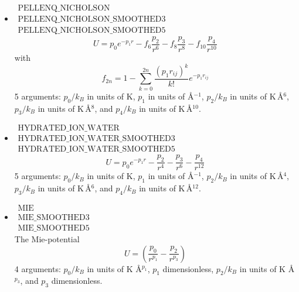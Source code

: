 \begin{itemize}
\item{$\begin{array}{l}\text{PELLENQ\_NICHOLSON}\\
      \text{PELLENQ\_NICHOLSON\_SMOOTHED3}\\
      \text{PELLENQ\_NICHOLSON\_SMOOTHED5}\end{array}$}\\
  \begin{equation}
    U= p_0 e^{-p_1 r}-f_6 \frac{p_2}{r^6}-f_8\frac{p_3}{r^8}-f_{10}\frac{p_4}{r^{10}}
  \end{equation}
  with
  \begin{equation}
   f_{2n}=1-\sum_{k=0}^{2n}\frac{\left(p_1 r_{ij}\right)^k}{k!} e^{-p_1 r_{ij}}
  \end{equation}
  5 arguments: $p_0/k_B$ in units of K, $p_1$ in units of \AA$^{-1}$, $p_2/k_B$ in units of K\,\AA$^{6}$,
  $p_3/k_B$ in units of K\,\AA$^{8}$, and $p_4/k_B$ in units of K\,\AA$^{10}$.

\item{$\begin{array}{l}\text{HYDRATED\_ION\_WATER}\\
      \text{HYDRATED\_ION\_WATER\_SMOOTHED3}\\
      \text{HYDRATED\_ION\_WATER\_SMOOTHED5}\end{array}$}\\
  \begin{equation}
    U= p_0 e^{-p_1 r}-\frac{p_2}{r^4}-\frac{p_3}{r^6}-\frac{p_4}{r^{12}}
  \end{equation}
  5 arguments: $p_0/k_B$ in units of K, $p_1$ in units of \AA$^{-1}$, $p_2/k_B$ in units of K\,\AA$^{4}$,
  $p_3/k_B$ in units of K\,\AA$^{6}$, and $p_4/k_B$ in units of K\,\AA$^{12}$.

\item{$\begin{array}{l}\text{MIE}\\
      \text{MIE\_SMOOTHED3}\\
      \text{MIE\_SMOOTHED5}\end{array}$}\\
The Mie-potential \cite{Mie1903}
  \begin{equation}
    U= 
      \left(\frac{p_0}{r^{p_1}}-\frac{p_2}{r^{p_3}}\right)
  \end{equation}
   4 arguments: $p_0/k_B$ in units of K \AA$^{p_1}$, $p_1$ dimensionless,
  $p_2/k_B$ in units of K \AA$^{p_3}$, and $p_3$ dimensionless.


\end{itemize}
